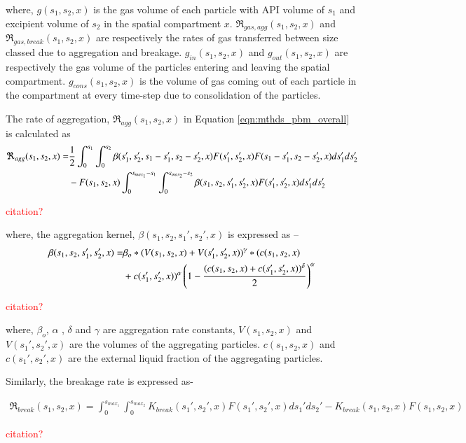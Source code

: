 \documentclass[preprint,11pt,authoryear]{elsarticle}
\begin{document}
    \par where, $g(s_1,s_2,x)$ is the gas volume of each particle with API volume of $s_1$ and excipient volume of $s_2$ in the spatial compartment $x$. $\Re_{gas,agg}(s_1,s_2,x)$ and $\Re_{gas,break}(s_1,s_2,x)$ are respectively the rates of gas transferred between size classed due to aggregation and breakage. $g_{in}(s_1,s_2,x)$ and $g_{out}(s_1,s_2,x)$ are respectively the gas volume of the particles entering and leaving the spatial compartment. $g_{cons}(s_1,s_2,x)$ is the volume of gas coming out of each particle in the compartment at every time-step due to consolidation of the particles. 
    \par The rate of aggregation, $\Re_{agg}(s_1,s_2,x)$ in Equation \ref{eqn:mthds_pbm_overall} is calculated as  
     \begin{align}
     \Re_{agg}(s_1,s_2,x)=& \frac{1}{2}\int _0^{s_1} \int_0^{s_2} \beta(s_1',s_2',s_1-s_1',s_2-s_2',x)F(s_1',s_2',x)F(s_1-s_1',s_2-s_2',x)ds_1'ds_2'\notag\\ 
     &- F(s_1,s_2,x)\int _0^{s_{max_1}-s_1} \int_0^{s_{max_2}-s_2} \beta(s_1,s_2,s_1',s_2',x)F(s_1',s_2',x)ds_1'ds_2'
     \end{align}
     \par \textcolor{red}{citation?}
     
    \par where, the aggregation kernel, $\beta(s_1,s_2, s_1',s_2',x)$ is expressed as –
    \begin{align}
    \beta(s_1,s_2,s_1',s_2',x) = & \beta_o*(V(s_1,s_2,x)+V(s_1',s_2',x))^{\gamma}*(c(s_1,s_2,x)\notag\\
    &+c(s_1',s_2',x))^{\alpha}\left(1-\frac{(c(s_1,s_2,x)+c(s_1',s_2',x))^{\delta}}{2}\right)^{\alpha}
    \label{eqn:mthds_pbm_beta_kernal}
    \end{align}
    \par \textcolor{red}{citation?}
    
    \par where, $\beta_o$,  $\alpha$ , $\delta$ and $\gamma$ are aggregation rate constants, $V(s_1,s_2, x)$ and $V(s_1',s_2',x)$ are the volumes of the aggregating particles. $c(s_1,s_2, x)$ and $c(s_1',s_2',x)$ are the external liquid fraction of the aggregating particles. 
    \par Similarly, the breakage rate is expressed as-

    \begin{align}
    \Re_{break}(s_1,s_2,x) = \int_0^{s_{max_1}} \int_0^{s_{max_2}} K_{break}(s_1',s_2',x)F(s_1',s_2',x)ds_1'ds_2' - K_{break}(s_1,s_2,x)F(s_1,s_2,x)
    \end{align}
    \par \textcolor{red}{citation?}
    
\end{document}
